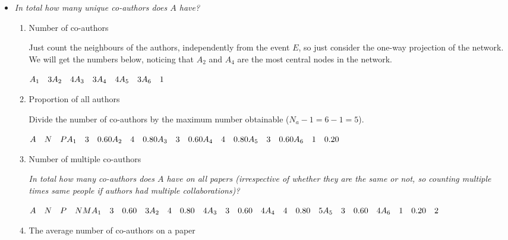 \documentclass[
  notitlepage,
  onecolumn,
  openany]{book}
\providecommand{\tightlist}{%
  \setlength{\itemsep}{0pt}\setlength{\parskip}{0pt}}
\begin{document}
\begin{itemize}
\tightlist
\item
  \emph{In total how many unique co-authors does \(A\) have?}

  \begin{enumerate}
  \def\labelenumi{\arabic{enumi}.}
  \item
    Number of co-authors

    Just count the neighbours of the authors, independently from the event \(E\), so just consider the one-way projection of the network. We will get the numbers below, noticing that \(A_2\) and \(A_4\) are the most central nodes in the network.

    \(A_1 \quad 3\\  A_2 \quad 4\\  A_3 \quad 3\\  A_4 \quad 4\\  A_5 \quad 3\\  A_6 \quad 1\)
  \item
    Proportion of all authors

    Divide the number of co-authors by the maximum number obtainable (\(N_a -1 = 6-1 = 5\)).

    \(A \quad N\quad P\\  A_1 \quad 3 \quad 0.60\\  A_2 \quad 4 \quad 0.80\\  A_3 \quad 3\quad 0.60\\  A_4 \quad 4\quad 0.80\\  A_5 \quad 3\quad 0.60\\  A_6 \quad 1 \quad 0.20\)
  \item
    Number of multiple co-authors

    \emph{In total how many co-authors does \(A\) have on all papers (irrespective of whether they are the same or not, so counting multiple times same people if authors had multiple collaborations)?}

    \(A \quad N\quad P \quad NM\\  A_1 \quad 3 \quad 0.60\quad 3\\  A_2 \quad 4 \quad 0.80\quad 4\\  A_3 \quad 3\quad 0.60\quad 4\\  A_4 \quad 4\quad 0.80\quad 5\\  A_5 \quad 3\quad 0.60\quad 4\\  A_6 \quad 1 \quad 0.20\quad 2\)
  \item
    The average number of co-authors on a paper


\end{enumerate}
\end{itemize}
\end{document}
